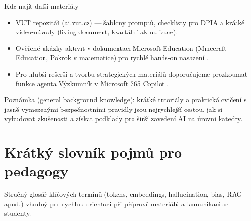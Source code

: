 \documentclass{report}%
\begin{document}
Kde najít další materiály
\begin{itemize}
  \item VUT repozitář (ai.vut.cz) — šablony promptů, checklisty pro DPIA a krátké video‑návody (living document; kvartální aktualizace).
  \item Ověřené ukázky aktivit v dokumentaci Microsoft Education (Minecraft Education, Pokrok v matematice) pro rychlé hands‑on nasazení \cite{kb_ai_101_tipu_pdf_04e4a115_page_15_2, kb_ai_101_tipu_pdf_04e4a115_page_8_1}.
  \item Pro hlubší rešerši a tvorbu strategických materiálů doporučujeme prozkoumat funkce agenta Výzkumník v Microsoft 365 Copilot \cite{kb_ai_101_tipu_pdf_04e4a115_page_48_1}.
\end{itemize}

Poznámka (general background knowledge): krátké tutoriály a praktická cvičení s jasně vymezenými bezpečnostními pravidly jsou nejrychlejší cestou, jak si vybudovat zkušenosti a získat podklady pro širší zavedení AI na úrovni katedry.%

%
\section{Krátký slovník pojmů pro pedagogy}%
Stručný glosář klíčových termínů (tokens, embeddings, hallucination, bias, RAG apod.) vhodný pro rychlou orientaci při přípravě materiálů a komunikaci se studenty.%
\end{document}
